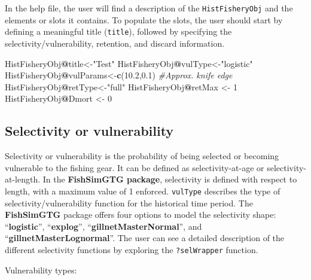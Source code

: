 \documentclass[
]{book}
\newenvironment{Shaded}{\begin{snugshade}}{\end{snugshade}}
\newcommand{\CommentTok}[1]{\textcolor[rgb]{0.56,0.35,0.01}{\textit{#1}}}
\newcommand{\DecValTok}[1]{\textcolor[rgb]{0.00,0.00,0.81}{#1}}
\newcommand{\FloatTok}[1]{\textcolor[rgb]{0.00,0.00,0.81}{#1}}
\newcommand{\FunctionTok}[1]{\textcolor[rgb]{0.13,0.29,0.53}{\textbf{#1}}}
\newcommand{\NormalTok}[1]{#1}
\newcommand{\OtherTok}[1]{\textcolor[rgb]{0.56,0.35,0.01}{#1}}
\newcommand{\SpecialCharTok}[1]{\textcolor[rgb]{0.81,0.36,0.00}{\textbf{#1}}}
\newcommand{\StringTok}[1]{\textcolor[rgb]{0.31,0.60,0.02}{#1}}
\begin{document}
In the help file, the user will find a description of the \texttt{HistFisheryObj} and the elements or slots it contains. To populate the slots, the user should start by defining a meaningful title (\texttt{title}), followed by specifying the selectivity/vulnerability, retention, and discard information.

\begin{Shaded}
\begin{Highlighting}[]
\NormalTok{HistFisheryObj}\SpecialCharTok{@}\NormalTok{title}\OtherTok{\textless{}{-}}\StringTok{"Test"}
\NormalTok{HistFisheryObj}\SpecialCharTok{@}\NormalTok{vulType}\OtherTok{\textless{}{-}}\StringTok{"logistic"}
\NormalTok{HistFisheryObj}\SpecialCharTok{@}\NormalTok{vulParams}\OtherTok{\textless{}{-}}\FunctionTok{c}\NormalTok{(}\FloatTok{10.2}\NormalTok{,}\FloatTok{0.1}\NormalTok{) }\CommentTok{\#Approx. knife edge}
\NormalTok{HistFisheryObj}\SpecialCharTok{@}\NormalTok{retType}\OtherTok{\textless{}{-}}\StringTok{"full"}
\NormalTok{HistFisheryObj}\SpecialCharTok{@}\NormalTok{retMax }\OtherTok{\textless{}{-}} \DecValTok{1}
\NormalTok{HistFisheryObj}\SpecialCharTok{@}\NormalTok{Dmort }\OtherTok{\textless{}{-}} \DecValTok{0}
\end{Highlighting}
\end{Shaded}

\subsection{Selectivity or vulnerability}\label{selectivity-or-vulnerability}

Selectivity or vulnerability is the probability of being selected or becoming vulnerable to the fishing gear. It can be defined as selectivity-at-age or selectivity-at-length. In the \textbf{FishSimGTG package}, selectivity is defined with respect to length, with a maximum value of 1 enforced.
\texttt{vulType} describes the type of selectivity/vulnerability function for the historical time period. The \textbf{FishSimGTG} package offers four options to model the selectivity shape: ``\textbf{logistic}'', ``\textbf{explog}'', ``\textbf{gillnetMasterNormal}'', and ``\textbf{gillnetMasterLognormal}''. The user can see a detailed description of the different selectivity functions by exploring the \texttt{?selWrapper} function.

Vulnerability types:
\end{document}
